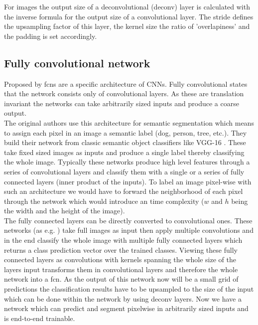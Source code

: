 For images the output size of a deconvolutional (deconv) layer is calculated with the inverse formula for the output size of a convolutional layer. The stride defines the upsampling factor of this layer, the kernel size the ratio of 'overlapiness' and the padding is set accordingly.

\subsection{Fully convolutional network} %
\label{sub:conepts:fcn:fcn}
Proposed by \citet{long_fully_2015} \glspl{fcn} are a specific architecture of CNNs. Fully convolutional states that the network consists only of convolutional layers. As these are translation invariant the networks can take arbitrarily sized inputs and produce a coarse output.\\
The original authors use this architecture for semantic segmentation which means to assign each pixel in an image a semantic label (dog, person, tree, etc.). They build their network from classic semantic object classifiers like VGG-16 \citep{simonyan_very_2014}. These take fixed sized images as inputs and produce a single label thereby classifying the whole image. Typically these networks produce high level features through a series of convolutional layers and classify them with a single or a series of fully connected layers (inner product of the inputs). To label an image pixel-wise with such an architecture we would have to forward the neighborhood of each pixel through the network which would introduce an  time complexity ($w$ and $h$ being the width and the height of the image).\\
The fully connected layers can be directly converted to convolutional ones.
 These networks (as e.g. ) take full images as input then apply multiple convolutions and in the end classify the whole image with multiple fully connected layers which returns a class prediction vector over the trained classes. Viewing these fully connected layers as convolutions with kernels spanning the whole size of the layers input transforms them in convolutional layers and therefore the whole network into a \gls{fcn}. As the output of this network now will be a small grid of predictions the classification results have to be upsampled to the size of the input which can be done within the network by using deconv layers. Now we have a network which can predict and segment pixelwise in arbitrarily sized inputs and is end-to-end trainable.

